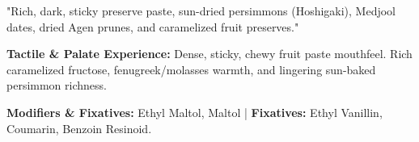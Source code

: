 \documentclass[11pt,a4paper]{article}
\begin{document}
\begin{sensoryquote}
"Rich, dark, sticky preserve paste, sun-dried persimmons (Hoshigaki), Medjool dates, dried Agen prunes, and caramelized fruit preserves."
\end{sensoryquote}

\begin{flavourbox}
\textbf{Tactile \& Palate Experience:} Dense, sticky, chewy fruit paste mouthfeel. Rich caramelized fructose, fenugreek/molasses warmth, and lingering sun-baked persimmon richness.
\end{flavourbox}

\begin{table}[htbp]
\centering
\caption{Primary Impact Actors for Facet 10 (Desiccated State)}
\vspace{0.3em}
\end{table}

\textbf{Modifiers \& Fixatives:} Ethyl Maltol, Maltol | \textbf{Fixatives:} Ethyl Vanillin, Coumarin, Benzoin Resinoid.

\newpage
\end{document}
